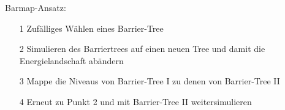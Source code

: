 Barmap-Ansatz:
\begin{itemize}
\item[1] Zufälliges Wählen eines Barrier-Tree
\item[2] Simulieren des Barriertrees auf einen neuen Tree und damit die Energielandschaft abändern
\item[3] Mappe die Niveaus von Barrier-Tree I zu denen von Barrier-Tree II
\item[4] Erneut zu Punkt 2 und mit Barrier-Tree II weitersimulieren 
\end{itemize}
